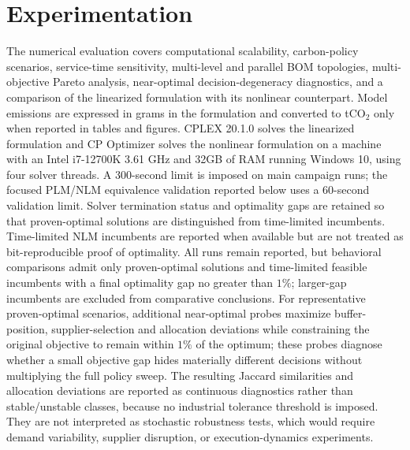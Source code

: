 \documentclass[preprint,12pt,authoryear]{elsarticle}
\begin{document}
\section{Experimentation}\label{sec:exp}
The numerical evaluation covers computational scalability, carbon-policy scenarios, service-time sensitivity, multi-level and parallel BOM topologies, multi-objective Pareto analysis, near-optimal decision-degeneracy diagnostics, and a comparison of the linearized formulation with its nonlinear counterpart. Model emissions are expressed in grams in the formulation and converted to tCO$_2$ only when reported in tables and figures. CPLEX 20.1.0 solves the linearized formulation and CP Optimizer solves the nonlinear formulation on a machine with an Intel i7-12700K 3.61 GHz and 32GB of RAM running Windows 10, using four solver threads. A 300-second limit is imposed on main campaign runs; the focused PLM/NLM equivalence validation reported below uses a 60-second validation limit. Solver termination status and optimality gaps are retained so that proven-optimal solutions are distinguished from time-limited incumbents. Time-limited NLM incumbents are reported when available but are not treated as bit-reproducible proof of optimality. All runs remain reported, but behavioral comparisons admit only proven-optimal solutions and time-limited feasible incumbents with a final optimality gap no greater than $1\%$; larger-gap incumbents are excluded from comparative conclusions. For representative proven-optimal scenarios, additional near-optimal probes maximize buffer-position, supplier-selection and allocation deviations while constraining the original objective to remain within $1\%$ of the optimum; these probes diagnose whether a small objective gap hides materially different decisions without multiplying the full policy sweep. The resulting Jaccard similarities and allocation deviations are reported as continuous diagnostics rather than stable/unstable classes, because no industrial tolerance threshold is imposed. They are not interpreted as stochastic robustness tests, which would require demand variability, supplier disruption, or execution-dynamics experiments.
\end{document}
